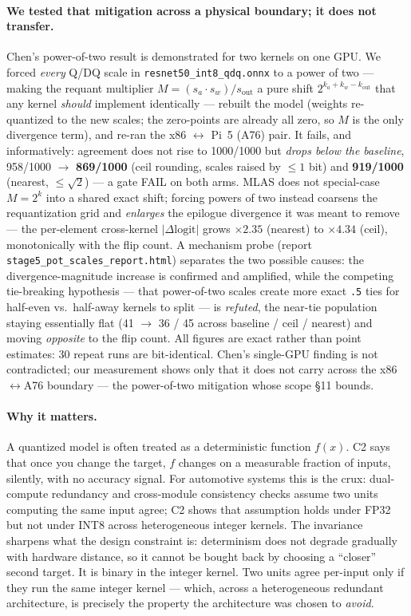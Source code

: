\documentclass[11pt]{article}
\begin{document}
\paragraph{We tested that mitigation across a physical boundary; it does not transfer.}
Chen's power-of-two result is demonstrated for two kernels on one GPU. We forced \emph{every} Q/DQ scale in \texttt{resnet50\_int8\_qdq.onnx} to a power of two --- making the requant multiplier $M = (s_a \cdot s_w)/s_\mathrm{out}$ a pure shift $2^{k_a + k_w - k_\mathrm{out}}$ that any kernel \emph{should} implement identically --- rebuilt the model (weights re-quantized to the new scales; the zero-points are already all zero, so $M$ is the only divergence term), and re-ran the x86 $\leftrightarrow$ Pi~5 (A76) pair. It fails, and informatively: agreement does not rise to 1000/1000 but \emph{drops below the baseline}, 958/1000 $\to$ \textbf{869/1000} (ceil rounding, scales raised by ${\le}1$ bit) and \textbf{919/1000} (nearest, ${\le}\sqrt{2}$) --- a gate FAIL on both arms. MLAS does not special-case $M = 2^k$ into a shared exact shift; forcing powers of two instead coarsens the requantization grid and \emph{enlarges} the epilogue divergence it was meant to remove --- the per-element cross-kernel $|\Delta\mathrm{logit}|$ grows $\times2.35$ (nearest) to $\times4.34$ (ceil), monotonically with the flip count. A mechanism probe (report \texttt{stage5\_pot\_scales\_report.html}) separates the two possible causes: the divergence-magnitude increase is confirmed and amplified, while the competing tie-breaking hypothesis --- that power-of-two scales create more exact \texttt{.5} ties for half-even vs.\ half-away kernels to split --- is \emph{refuted}, the near-tie population staying essentially flat (41 $\to$ 36 / 45 across baseline / ceil / nearest) and moving \emph{opposite} to the flip count. All figures are exact rather than point estimates: 30 repeat runs are bit-identical. Chen's single-GPU finding is not contradicted; our measurement shows only that it does not carry across the x86$\leftrightarrow$A76 boundary --- the power-of-two mitigation whose scope \S11 bounds.

\paragraph{Why it matters.}
A quantized model is often treated as a deterministic function $f(x)$. C2 says that once you change the target, $f$ changes on a measurable fraction of inputs, silently, with no accuracy signal. For automotive systems this is the crux: dual-compute redundancy and cross-module consistency checks assume two units computing the same input agree; C2 shows that assumption holds under FP32 but not under INT8 across heterogeneous integer kernels. The invariance sharpens what the design constraint is: determinism does not degrade gradually with hardware distance, so it cannot be bought back by choosing a ``closer'' second target. It is binary in the integer kernel. Two units agree per-input only if they run the same integer kernel --- which, across a heterogeneous redundant architecture, is precisely the property the architecture was chosen to \emph{avoid}.
\end{document}

